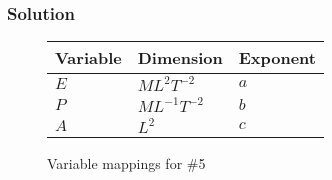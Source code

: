 \documentclass[12pt,twoside]{article}
\begin{document}
  \subsubsection*{Solution}
  \begin{figure}
    \centering
    \begin{tabularx}{0.5\textwidth}{XXX}
      Variable & Dimension & Exponent \\ \midrule
      $E$ & $ML^2T^{-2}$ & $a$ \\
      $P$ & $ML^{-1}T^{-2}$ & $b$ \\
      $A$ & $L^2$ & $c$ \\
    \end{tabularx}
    \caption{Variable mappings for \#5}
\label{fig:5-var-mappings}
  \end{figure}
\end{document}
